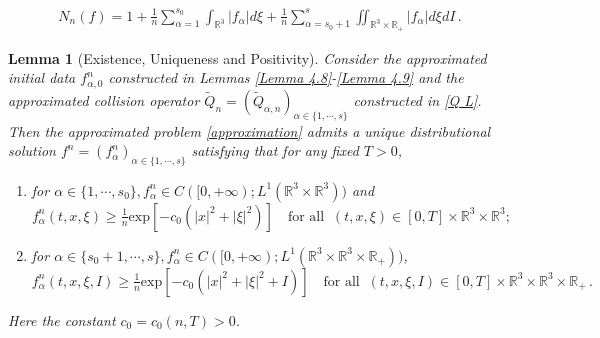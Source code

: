 \documentclass[10pt,a4paper]{amsart}
\newtheorem{lemma}{Lemma}
\def\R{\mathbb{R}}
\def\exp{\mathrm{exp}}
\begin{document}
\begin{equation}\label{Nnf}
  \begin{aligned}
    N_n (f) = 1 + \tfrac{1}{n} \sum_{\alpha = 1}^{s_0} \int_{\R^3} | f_\alpha | d \xi + \tfrac{1}{n} \sum_{\alpha = s_0 + 1}^{s} \iint_{\R^3\times \R_+} | f_\alpha | d\xi dI \,. 
  \end{aligned}
\end{equation}

\begin{lemma}[Existence, Uniqueness and Positivity]\label{Lemma 4.14}
Consider the approximated initial data $f_{\alpha, 0}^n$ constructed in Lemmas \ref{Lemma 4.8}-\ref{Lemma 4.9} and the approximated collision operator $\tilde{Q}_{n} = ( \tilde{Q}_{\alpha, n} )_{\alpha \in \{ 1, \cdots, s \}}$ constructed in \eqref{Q L}. Then the approximated problem \eqref{approximation} admits a unique distributional solution $f^n = ( f^n_\alpha )_{\alpha \in \{ 1, \cdots, s \}}$ satisfying that for any fixed $T>0$,
\begin{enumerate}
\item{for $\alpha \in \{1,\cdots,s_0\}, f^n_\alpha \in C([0,+\infty ); L^1(\R^3 \times \R^3 ))$ and
\begin{equation*}
	f^n_\alpha (t,x,\xi ) \geq \tfrac{1}{n} \exp [ -c_0 (|x|^2+|\xi |^2 ) ] \quad \textrm{for all } \ (t,x,\xi ) \in [0, T] \times \R^3 \times \R^3 ;
	\end{equation*}}
\item{for $\alpha \in \{s_0+1,\cdots,s\}, f^n_\alpha \in C([0,+\infty ); L^1(\R^3 \times \R^3 \times \R_+))$,
	\begin{equation*}
		f^n_\alpha (t,x,\xi , I ) \geq \tfrac{1}{n} \exp [ -c_0 (|x|^2+|\xi |^2 + I ) ] \quad \textrm{for all } \ (t,x,\xi , I ) \in [0, T] \times \R^3 \times \R^3 \times \R_+ \,.
\end{equation*}}	
\end{enumerate}
Here the constant $c_0 = c_0 (n,T)>0 $.
\end{lemma}
\end{document}
